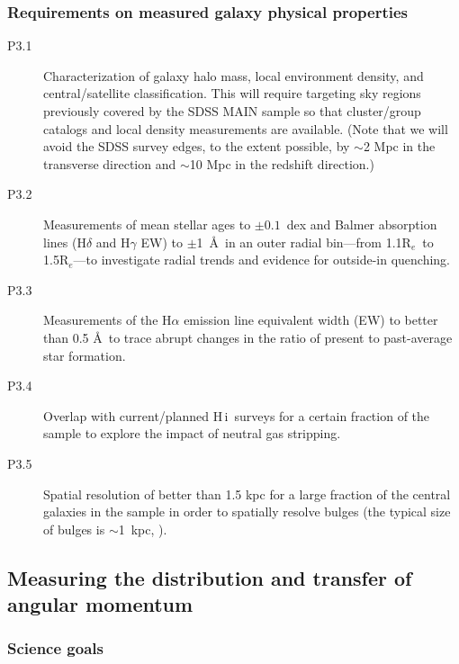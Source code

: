 \documentclass[preprint,11pt]{aastex}
\newcommand{\Reff}{{R$_{e}$}}
\newcommand{\HI}{{\sc H\,i}}
\begin{document}
\subsubsection{Requirements on measured galaxy physical properties}

\begin{description}

\item[P3.1] Characterization of galaxy halo mass, local environment
  density, and central/satellite classification.  This will require
  targeting sky regions previously covered by the SDSS MAIN sample so
  that cluster/group catalogs and local density measurements are
  available.  (Note that we will avoid the SDSS survey edges, to the
  extent possible, by $\sim$2 Mpc in the transverse direction and
  $\sim$10 Mpc in the redshift direction.)

\item[P3.2] Measurements of mean stellar ages to $\pm0.1$~dex and Balmer absorption lines (H$\delta$ and H$\gamma$ EW) to $\pm$1~\AA\ in an outer radial bin---from 1.1\Reff\ to 1.5\Reff---to investigate
  radial trends and evidence for outside-in quenching.

\item[P3.3] Measurements of the H$\alpha$ emission line equivalent
  width (EW) to better than 0.5 \AA\ to trace abrupt changes in the
  ratio of present to past-average star formation.

\item[P3.4] Overlap with current/planned \HI\ surveys for a certain
fraction of the sample to explore the impact of neutral gas stripping.

\item[P3.5] Spatial resolution of better than 1.5 kpc for a large
  fraction of the central galaxies in the sample in order to spatially
  resolve bulges (the typical size of bulges is $\sim$1~kpc, \citealt{fisher2010}).


\end{description}


\subsection{Measuring the distribution and transfer of angular momentum}
\label{sec:dyn_scaling}

\subsubsection{Science goals}
\end{document}

